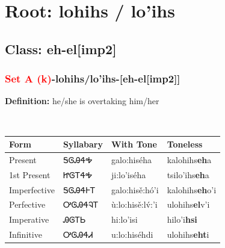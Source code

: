 \needspace{4in}
\section*{Root: lohihs / lo'ihs}
\nopagebreak
{}
\needspace{3in}
\subsection*{Class: eh-el[imp2]}
\nopagebreak
\needspace{2in}
\subsubsection*{\textcolor{Red}{Set A (k)}{-}\textbf{lohihs/lo'ihs}{-}[eh-el[imp2]]}
\nopagebreak
\textbf{Definition: } he/she is overtaking him/her
\\[0.5em]
\begin{tabularx}{\textwidth}{l X X X}%
\toprule%
\textbf{Form}&\textbf{Syllabary}&\textbf{With Tone}&\textbf{Toneless}\\%
\midrule%
Present&ᎦᎶᎯᏎᎭ&galo:hiséha&kalohihs\textbf{eh}a\\%
1st Present&ᏥᎶᎢᏎᎭ&ji:lo’iséha&tsilo'ihs\textbf{eh}a\\%
Imperfective&ᎦᎶᎯᏎᎰᎢ&galo:hisě:hó’i&kalohihs\textbf{eh}o'i\\%
Perfective&ᎤᎶᎯᏎᎸᎢ&ù:lo:hisě:lv́:’i&ulohihs\textbf{el}v'i\\%
Imperative&ᎯᎶᎢᏏ&hi:lo’isi&hilo'i\textbf{hsi}\\%
Infinitive&ᎤᎶᎯᏎᏗ&u:lo:hiséhdi&ulohihs\textbf{eht}i\\%
\bottomrule%
\end{tabularx}
\\[1em]